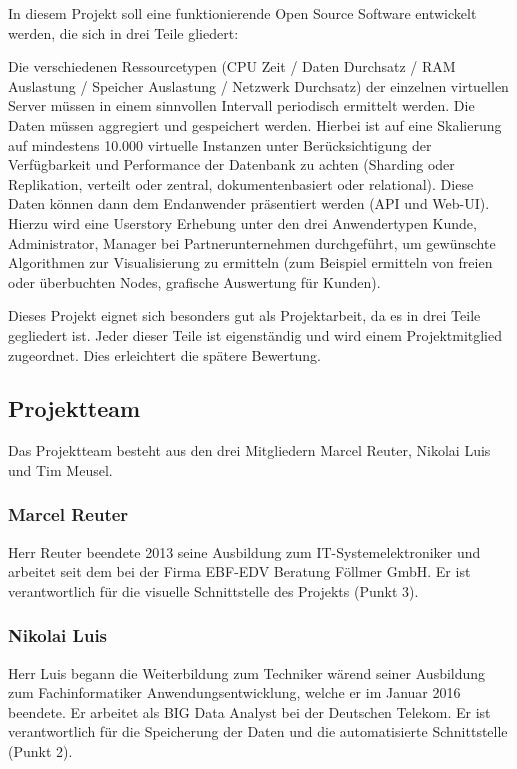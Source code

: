 In diesem Projekt soll eine funktionierende Open Source Software entwickelt
werden, die sich in drei Teile gliedert:
\begin{outline}
  \1 Die verschiedenen Ressourcetypen (CPU Zeit / Daten Durchsatz / RAM
  Auslastung / Speicher Auslastung / Netzwerk Durchsatz) der einzelnen
  virtuellen Server müssen in einem sinnvollen Intervall periodisch ermittelt
  werden.
  \1 Die Daten müssen aggregiert und gespeichert werden. Hierbei ist auf eine
  Skalierung auf mindestens 10.000 virtuelle Instanzen unter Berücksichtigung
  der Verfügbarkeit und Performance der Datenbank zu achten (Sharding oder
  Replikation, verteilt oder zentral, dokumentenbasiert oder relational).
  \1 Diese Daten können dann dem Endanwender präsentiert werden (API und
  Web-UI). Hierzu wird eine Userstory Erhebung unter den drei Anwendertypen
  Kunde, Administrator, Manager bei Partnerunternehmen durchgeführt, um
  gewünschte Algorithmen zur Visualisierung zu ermitteln (zum Beispiel
  ermitteln von freien oder überbuchten Nodes, grafische Auswertung für Kunden).
\end{outline}

Dieses Projekt eignet sich besonders gut als Projektarbeit, da es in drei Teile
gegliedert ist. Jeder dieser Teile ist eigenständig und wird einem
Projektmitglied zugeordnet. Dies erleichtert die spätere Bewertung.

\subsection{Projektteam}
Das Projektteam besteht aus den drei Mitgliedern Marcel Reuter, Nikolai Luis
und Tim Meusel.

\subsubsection{Marcel Reuter}
Herr Reuter beendete 2013 seine Ausbildung zum IT-Systemelektroniker
und arbeitet seit dem bei der Firma EBF-EDV Beratung Föllmer GmbH. Er ist verantwortlich
für die visuelle Schnittstelle des Projekts (Punkt 3).

\subsubsection{Nikolai Luis}
Herr Luis begann die Weiterbildung zum Techniker wärend seiner Ausbildung zum
Fachinformatiker Anwendungsentwicklung, welche er im Januar 2016 beendete. Er arbeitet
als BIG Data Analyst bei der Deutschen Telekom. Er ist verantwortlich
für die Speicherung der Daten und die automatisierte Schnittstelle (Punkt 2).

